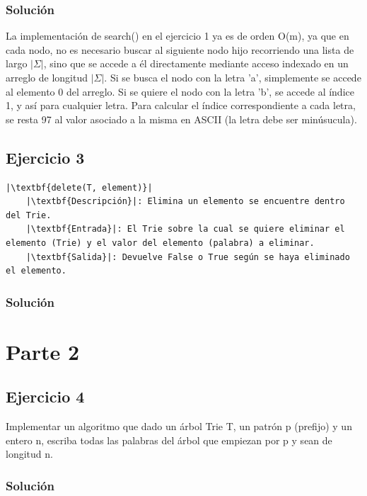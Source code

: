 \documentclass{article}
\begin{document}
\subsubsection*{Solución}
La implementación de search() en el ejercicio 1 ya es de orden O(m), ya que en cada nodo, no es necesario buscar al siguiente nodo hijo recorriendo una lista de largo $|\Sigma|$, sino que se accede a él directamente mediante acceso indexado en un arreglo de longitud $|\Sigma|$. Si se busca el nodo con la letra 'a', simplemente se accede al elemento 0 del arreglo. Si se quiere el nodo con la letra 'b', se accede al índice 1, y así para cualquier letra. Para calcular el índice correspondiente a cada letra, se resta 97 al valor asociado a la misma en ASCII (la letra debe ser minúsucula).


\subsection*{Ejercicio 3}
\begin{lstlisting}
|\textbf{delete(T, element)}|
    |\textbf{Descripción}|: Elimina un elemento se encuentre dentro del Trie.
    |\textbf{Entrada}|: El Trie sobre la cual se quiere eliminar el elemento (Trie) y el valor del elemento (palabra) a eliminar.
    |\textbf{Salida}|: Devuelve False o True según se haya eliminado el elemento.
\end{lstlisting}
\subsubsection*{Solución}


\pagebreak
\section*{Parte 2}
\subsection*{Ejercicio 4}
Implementar un algoritmo que dado un árbol Trie T, un patrón p (prefijo) y un entero n, escriba todas las palabras del árbol que empiezan por p y sean de longitud n.
\subsubsection*{Solución}


\pagebreak
\end{document}
